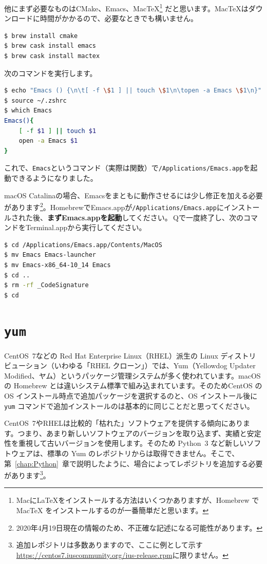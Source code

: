 他にまず必要なものはCMake、Emacs、MacTeX\footnote{Macに\LaTeX をインストールする方法はいくつかありますが、Homebrew で MacTeX をインストールするのが一番簡単だと思います。} だと思います。MacTeXはダウンロードに時間がかかるので、必要なときでも構いません。
\begin{lstlisting}[language=bash]
$ brew install cmake
$ brew cask install emacs
$ brew cask install mactex
\end{lstlisting}

次のコマンドを実行します。
\begin{lstlisting}[language=bash]
$ echo "Emacs () {\n\t[ -f \$1 ] || touch \$1\n\topen -a Emacs \$1\n}" >> ~/.zshrc
$ source ~/.zshrc
$ which Emacs
Emacs(){
	[ -f $1 ] || touch $1
	open -a Emacs $1
}
\end{lstlisting}
これで、\texttt{Emacs}というコマンド（実際は関数）で\texttt{/Applications/Emacs.app}を起動できるようになりました。

macOS Catalinaの場合、Emacsをまともに動作させるには少し修正を加える必要があります\footnote{2020年4月19日現在の情報のため、不正確な記述になる可能性があります。}。HomebrewでEmacs.appが\texttt{/Applications/Emacs.app}にインストールされた後、\textbf{まずEmacs.appを起動}してください。\cmdkey\,Qで一度終了し、次のコマンドをTerminal.appから実行してください。

\begin{lstlisting}[language=bash]
$ cd /Applications/Emacs.app/Contents/MacOS 
$ mv Emacs Emacs-launcher
$ mv Emacs-x86_64-10_14 Emacs
$ cd ..
$ rm -rf _CodeSignature
$ cd
\end{lstlisting}

\section{\texttt{yum}}

CentOS~7などの Red Hat Enterprise Linux（RHEL）派生の Linux ディストリビューション（いわゆる「RHEL クローン」）では、Yum（Yellowdog Updater Modified、ヤム）というパッケージ管理システムが多く使われています。macOS の Homebrew とは違いシステム標準で組み込まれています。そのためCentOS の OS インストール時点で追加パッケージを選択するのと、OS インストール後に \texttt{yum} コマンドで追加インストールのは基本的に同じことだと思ってください。

CentOS~7やRHELは比較的「枯れた」ソフトウェアを提供する傾向にあります。つまり、あまり新しいソフトウェアのバージョンを取り込まず、実績と安定性を重視して古いバージョンを使用します。そのため Python~3 など新しいソフトウェアは、標準の Yum のレポジトリからは取得できません。そこで、第~\ref{chap:Python}~章で説明したように、場合によってレポジトリを追加する必要があります\footnote{追加レポジトリは多数ありますので、ここに例として示す\url{https://centos7.iuscommunity.org/ius-release.rpm}に限りません。}。

